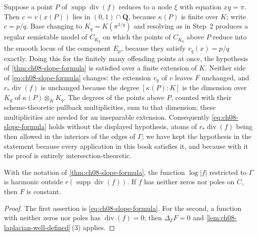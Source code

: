 \begin{remark}
\label{rem:ch08-slope-scope}
Suppose a point $P$ of $\operatorname{supp}\operatorname{div}(f)$ reduces to
a node $\xi$ with equation $xy=\pi$.  Then $c=v(x(P))$ lies in
$(0,1)\cap\mathbf Q$, because $\kappa(P)$ is finite over $K$; write
$c=p/q$.  Base changing to $K_q=K(\pi^{1/q})$ and resolving as in Step~2
produces a regular semistable model of $C_{K_q}$ on which the points of
$C_{K_q}$ above $P$ reduce into the smooth locus of the component $E_{p}$,
because they satisfy $v_q(x)=p/q$ exactly.  Doing this for the finitely many
offending points at once, the hypothesis of
\cref{thm:ch08-slope-formula} is satisfied over a finite extension of $K$.
Neither side of \eqref{eq:ch08-slope-formula} changes: the extension $v_q$ of
$v$ leaves $F$ unchanged, and $r_*\operatorname{div}(f)$ is unchanged because
the degree $[\kappa(P):K]$ is the dimension over $K_q$ of
$\kappa(P)\otimes_KK_q$.  The degrees of the points above $P$, counted
with their scheme-theoretic pullback multiplicities, sum to that dimension;
these multiplicities are needed for an inseparable extension.  Consequently \eqref{eq:ch08-slope-formula} holds without the
displayed hypothesis, atoms of $r_*\operatorname{div}(f)$ being then allowed
in the interiors of the edges of $\Gamma$; we have kept the hypothesis in the
statement because every application in this book satisfies it, and because
with it the proof is entirely intersection-theoretic.
\end{remark}

\begin{corollary}
\label{cor:ch08-harmonic-away}
With the notation of \cref{thm:ch08-slope-formula}, the function
$\log|f|$ restricted to $\Gamma$ is harmonic outside
$r(\operatorname{supp}\operatorname{div}(f))$.  If $f$ has neither zeros nor
poles on $C$, then $F$ is constant.
\end{corollary}

\begin{proof}
The first assertion is \eqref{eq:ch08-slope-formula}.  For the second, a
function with neither zeros nor poles has
$\operatorname{div}(f)=0$; then $\Delta_\Gamma F=0$ and
\cref{lem:ch08-laplacian-well-defined}\,(3) applies.
\end{proof}

